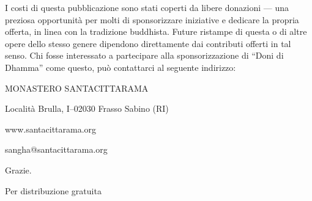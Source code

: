 \documentclass[11pt,twoside,final]{memoir}
\begin{document}
I costi di questa pubblicazione sono stati coperti da libere donazioni
--- una preziosa opportunità per molti di sponsorizzare iniziative e
dedicare la propria offerta, in linea con la tradizione buddhista.
Future ristampe di questa o di altre opere dello stesso genere dipendono
direttamente dai contributi offerti in tal senso. Chi fosse interessato
a partecipare alla sponsorizzazione di ``Doni di Dhamma'' come questo,
può contattarci al seguente indirizzo:

MONASTERO SANTACITTARAMA

Località Brulla, I--02030 Frasso Sabino (RI)

www.santacittarama.org

sangha@santacittarama.org

Grazie.

Per distribuzione gratuita


\cleartorecto
\thispagestyle{plain}


\emptysheet
\end{document}

